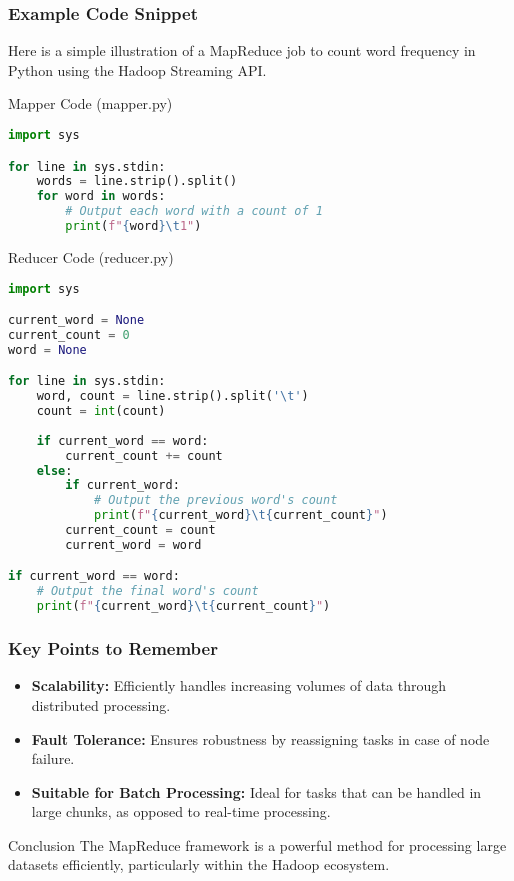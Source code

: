 \documentclass[aspectratio=169]{beamer}
\begin{document}
\begin{frame}[fragile]
    \frametitle{Example Code Snippet}
    Here is a simple illustration of a MapReduce job to count word frequency in Python using the Hadoop Streaming API.
    
    \begin{block}{Mapper Code (mapper.py)}
        \begin{lstlisting}[language=Python]
import sys

for line in sys.stdin:
    words = line.strip().split()
    for word in words:
        # Output each word with a count of 1
        print(f"{word}\t1")
        \end{lstlisting}
    \end{block}

    \begin{block}{Reducer Code (reducer.py)}
        \begin{lstlisting}[language=Python]
import sys

current_word = None
current_count = 0
word = None

for line in sys.stdin:
    word, count = line.strip().split('\t')
    count = int(count)
    
    if current_word == word:
        current_count += count
    else:
        if current_word:
            # Output the previous word's count
            print(f"{current_word}\t{current_count}")
        current_count = count
        current_word = word

if current_word == word:
    # Output the final word's count
    print(f"{current_word}\t{current_count}")
        \end{lstlisting}
    \end{block}
\end{frame}

\begin{frame}[fragile]
    \frametitle{Key Points to Remember}
    \begin{itemize}
        \item \textbf{Scalability:} Efficiently handles increasing volumes of data through distributed processing.
        \item \textbf{Fault Tolerance:} Ensures robustness by reassigning tasks in case of node failure.
        \item \textbf{Suitable for Batch Processing:} Ideal for tasks that can be handled in large chunks, as opposed to real-time processing.
    \end{itemize}
    
    \begin{block}{Conclusion}
        The MapReduce framework is a powerful method for processing large datasets efficiently, particularly within the Hadoop ecosystem.
    \end{block}
\end{frame}
\end{document}
